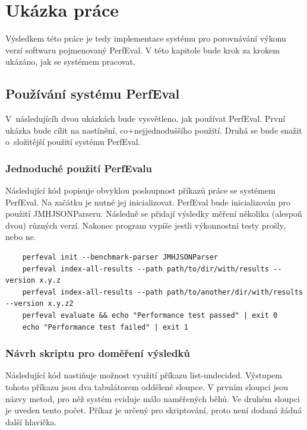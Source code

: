 \chapter{Ukázka práce}

Výsledkem této práce je tedy implementace systému pro porovnávání výkonu verzí softwaru
pojmenovaný PerfEval. V této kapitole bude krok za krokem ukázáno, jak se systémem pracovat.

\section{Používání systému PerfEval}

V~následujícíh dvou ukázkách bude vysvětleno, jak používat PerfEval. První ukázka bude
cílit na nastínění, co+nejjednoduššího použití. Druhá se bude snažit o~složitější použití
systému PerfEval.

\subsection*{Jednoduché použití PerfEvalu}

Následující kód popisuje obvyklou posloupnost příkazů práce se systémem PerfEval.
Na začátku je nutné jej inicializovat. PerfEval bude inicializován pro použití JMHJSONParseru.
Následně se přidají výsledky měření několika (alespoň dvou) různých verzí.
Nakonec program vypíše jestli výkonnostní testy prošly, nebo ne.

\begin{lstlisting}
    perfeval init --benchmark-parser JMHJSONParser
    perfeval index-all-results --path path/to/dir/with/results --version x.y.z
    perfeval index-all-results --path path/to/another/dir/with/results --version x.y.z2
    perfeval evaluate && echo "Performance test passed" | exit 0
    echo "Performance test failed" | exit 1
\end{lstlisting}

\subsection*{Návrh skriptu pro doměření výsledků}

Následující kód nastiňuje možnost využití příkazu list-undecided. Výstupem tohoto příkazu
jsou dva tabulátorem oddělené sloupce. V prvním sloupci jsou názvy metod, pro něž systém
eviduje málo naměřených běhů. Ve druhém sloupci je uveden tento počet. Příkaz je určený
pro skriptování, proto není dodaná žádná další hlavička.

